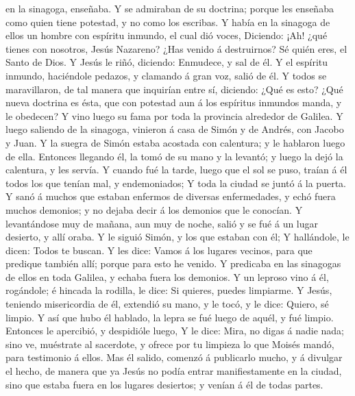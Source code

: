 en la sinagoga, enseñaba.  Y se admiraban de su doctrina;
porque les enseñaba como quien tiene potestad, y no como los escribas.
 Y había en la sinagoga de ellos un hombre con espíritu
inmundo, el cual dió voces,  Diciendo: ¡Ah! ¿qué tienes
con nosotros, Jesús Nazareno? ¿Has venido á destruirnos? Sé quién eres,
el Santo de Dios.  Y Jesús le riñó, diciendo: Enmudece, y
sal de él.  Y el espíritu inmundo, haciéndole pedazos, y
clamando á gran voz, salió de él.  Y todos se
maravillaron, de tal manera que inquirían entre sí, diciendo: ¿Qué es
esto? ¿Qué nueva doctrina es ésta, que con potestad aun á los espíritus
inmundos manda, y le obedecen?  Y vino luego su fama por
toda la provincia alrededor de Galilea.  Y luego saliendo
de la sinagoga, vinieron á casa de Simón y de Andrés, con Jacobo y Juan.
 Y la suegra de Simón estaba acostada con calentura; y le
hablaron luego de ella.  Entonces llegando él, la tomó de
su mano y la levantó; y luego la dejó la calentura, y les servía.
 Y cuando fué la tarde, luego que el sol se puso, traían
á él todos los que tenían mal, y endemoniados;  Y toda la
ciudad se juntó á la puerta.  Y sanó á muchos que estaban
enfermos de diversas enfermedades, y echó fuera muchos demonios; y no
dejaba decir á los demonios que le conocían.  Y
levantándose muy de mañana, aun muy de noche, salió y se fué á un lugar
desierto, y allí oraba.  Y le siguió Simón, y los que
estaban con él;  Y hallándole, le dicen: Todos te buscan.
 Y les dice: Vamos á los lugares vecinos, para que
predique también allí; porque para esto he venido.  Y
predicaba en las sinagogas de ellos en toda Galilea, y echaba fuera los
demonios.  Y un leproso vino á él, rogándole; é hincada
la rodilla, le dice: Si quieres, puedes limpiarme.  Y
Jesús, teniendo misericordia de él, extendió su mano, y le tocó, y le
dice: Quiero, sé limpio.  Y así que hubo él hablado, la
lepra se fué luego de aquél, y fué limpio.  Entonces le
apercibió, y despidióle luego,  Y le dice: Mira, no digas
á nadie nada; sino ve, muéstrate al sacerdote, y ofrece por tu limpieza
lo que Moisés mandó, para testimonio á ellos.  Mas él
salido, comenzó á publicarlo mucho, y á divulgar el hecho, de manera que
ya Jesús no podía entrar manifiestamente en la ciudad, sino que estaba
fuera en los lugares desiertos; y venían á él de todas partes.

